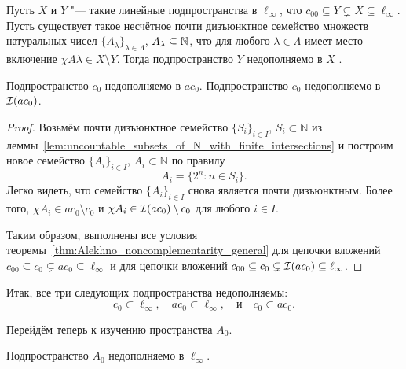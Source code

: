 \begin{theorem}
	\label{thm:Alekhno_noncomplementarity_general}
	Пусть $X$ и $Y$ "--- такие линейные подпространства в $\ell_\infty$,
	что $c_{00} \subseteq Y \subsetneq X \subseteq \ell_\infty$.
	Пусть существует такое несчётное почти дизъюнктное семейство множеств натуральных чисел $\{A_\lambda\}_{\lambda \in \Lambda}$,
	$A_\lambda \subseteq \mathbb{N}$, что для любого $\lambda \in \Lambda$ имеет место включение $\chi {A\lambda} \in X \setminus Y$.
	Тогда подпространство $Y$ недополняемо в $X$ .
\end{theorem}

\begin{corollary}
	Подпространство $c_0$ недополняемо в $ac_0$.
	Подпространство $c_0$ недополняемо в $\mathcal{I}(ac_0)$.
\end{corollary}

\begin{proof}
	Возьмём почти дизъюнктное семейство $\{S_i\}_{i\in I}$, $S_i \subset \mathbb{N}$
	из леммы~\ref{lem:uncountable_subsets_of_N_with_finite_intersections}
	и построим новое семейство $\{A_i\}_{i\in I}$, $A_i \subset \mathbb{N}$
	по правилу
	\begin{equation}
		\label{eq:c0_noncomplemented_in_ac0_set_family}
		A_i = \{ 2^n : n\in S_i \}
		.
	\end{equation}
	Легко видеть, что семейство $\{A_i\}_{i\in I}$ снова является почти дизъюнктным.
	Более того, $\chi {A_i} \in ac_0 \setminus c_0$ и $\chi {A_i} \in \mathcal{I}(ac_0) \setminus c_0$ для любого $i\in I$.

	Таким образом, выполнены все условия теоремы~\ref{thm:Alekhno_noncomplementarity_general}
	для цепочки вложений $c_{00} \subseteq c_0 \subsetneq ac_0 \subseteq \ell_\infty$ и
	для цепочки вложений $c_{00} \subseteq c_0 \subsetneq \mathcal{I}(ac_0) \subseteq \ell_\infty$.
\end{proof}


Итак, все три следующих подпространства недополняемы:
\begin{equation}
	c_0 \subset \ell_\infty,
	\quad
	ac_0 \subset \ell_\infty,
	\quad\mbox{и}\quad
	c_0 \subset ac_0
	.
\end{equation}


Перейдём теперь к изучению пространства $A_0$.

\begin{proposition}
	Подпространство $A_0$ недополняемо в $\ell_\infty$.
\end{proposition}

